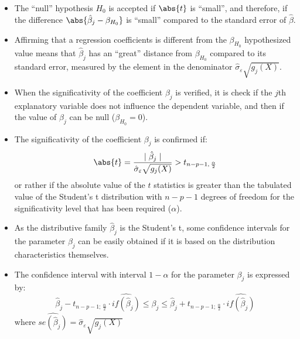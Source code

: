 \begin{frame}
  \vspace*{.75cm}
  \begin{itemize}
    \item The ``null'' hypothesis $ H_0 $ is accepted if $ \abs{t} $ is ``small'', and therefore, if the difference $ \abs{\hat{\beta}_j-\beta_{H_0}} $ is ``small'' compared to the standard error of $ \hat{\beta} $.
    \vspace*{.75cm}
    \item Affirming that a regression coefficients is different from the $ \beta_{H_0}  $  hypothesized value means that $ \hat{\beta}_j $ has an ``great'' distance from $ \beta_{H_0} $ compared to its standard error, measured by the element in the denominator $\hat{\sigma}_{\varepsilon}\sqrt{g_j(X)}$.
  \end{itemize}
\end{frame}

\begin{frame}
  \vspace*{.75cm}
  \begin{itemize}   
    \item When the significativity of the coefficient $ \beta_j $ is verified, it is check if the $j$th explanatory variable does not influence the dependent variable, and then if the value of $ \beta_j $ can be null ($ \beta_{H_0} = 0 $).
    \vspace*{.75cm}
    \item The significativity of the coefficient $ \beta_j $ is confirmed if:
      $$ \abs{t} = \frac{\mid\hat{\beta}_j\mid }{\hat{\sigma}_{\varepsilon}\sqrt{g_j(X)}} > t_{n-p-1,\,\frac{\alpha}{2}} $$
      or rather if the absolute value of the $ t $ statistics is greater than the tabulated value of the Student's t distribution with $ n-p-1 $ degrees of freedom for the significativity level that has been required ($ \alpha $).
  \end{itemize}
\end{frame}

\begin{frame}
  \vspace*{.5cm}
  \begin{itemize}
  \item As the distributive family $\hat{\beta}_j$ is the Student's t, some confidence intervals for the parameter  $\beta_j$ can be easily obtained if it is based on the distribution characteristics themselves. 
  \vspace*{.5cm}
  \item The confidence interval with interval $1-\alpha$ for the parameter $\beta_j$ is expressed by:
    $$\hat{\beta}_j-t_{n-p-1;\,\frac{\alpha}{2}}\cdot \widehat{if(\hat{\beta}_j)}\leqslant\beta_j\leqslant\hat{\beta}_j+t_{n-p-1;\,\frac{\alpha}{2}}\cdot \widehat{if(\hat{\beta}_j)}$$
    where $\widehat{se(\hat{\beta}_j)}=\hat{\sigma}_{\varepsilon}\sqrt{g_j(X)}$
\end{itemize}
\end{frame}

